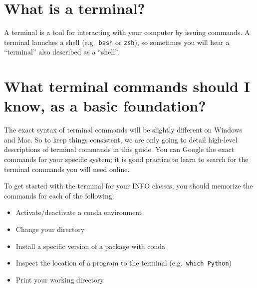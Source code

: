\section{What is a terminal?}

A terminal is a tool for interacting with your computer by issuing commands. A terminal launches a shell (e.g.\ \texttt{bash} or \texttt{zsh}), so sometimes you will hear a ``terminal'' also described as a ``shell''.

\section{What terminal commands should I know, as a basic foundation?}

The exact syntax of terminal commands will be slightly different on Windows and Mac. So to keep things consistent, we are only going to detail high-level descriptions of terminal commands in this guide. 
You can Google the exact commands for your specific system; it is good practice to learn to search for the terminal commands you will need online.

To get started with the terminal for your INFO classes, you should memorize the commands for each of the following: 

\begin{itemize}
\item Activate/deactivate a conda environment
\item Change your directory
\item Install a specific version of a package with conda
\item Inspect the location of a program to the terminal (e.g.\ \texttt{which Python})
\item Print your working directory
\end{itemize}